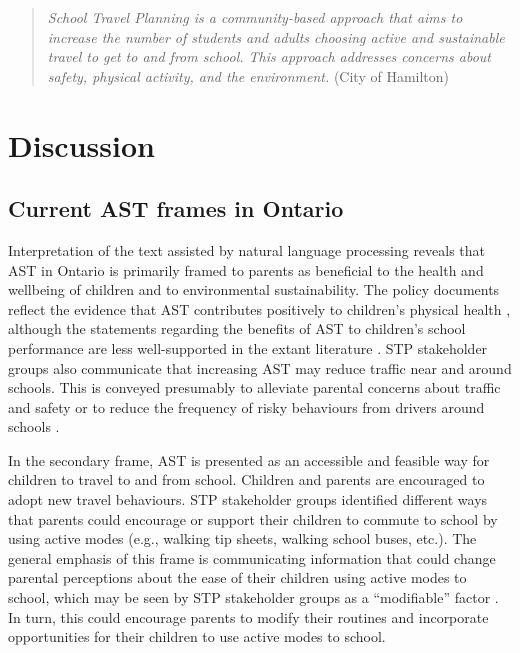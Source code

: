 \documentclass[preprint, 3p,
authoryear]{elsarticle} %
\begin{document}
\begin{quote}
\emph{School Travel Planning is a community-based approach that aims to
increase the number of students and adults choosing active and
sustainable travel to get to and from school. This approach addresses
concerns about safety, physical activity, and the environment.} (City of
Hamilton)
\end{quote}

\hypertarget{discussion}{%
\section{Discussion}\label{discussion}}

\hypertarget{current-ast-frames-in-ontario}{%
\subsection{Current AST frames in
Ontario}\label{current-ast-frames-in-ontario}}

Interpretation of the text assisted by natural language processing
reveals that AST in Ontario is primarily framed to parents as beneficial
to the health and wellbeing of children and to environmental
sustainability. The policy documents reflect the evidence that AST
contributes positively to children's physical health
\citep[see][]{faulknerActiveSchoolTransport2009, schoeppeAssociationsChildrenActive2015},
although the statements regarding the benefits of AST to children's
school performance are less well-supported in the extant literature
\citep{westmanTravelChildWellbeing2020}. STP stakeholder groups also
communicate that increasing AST may reduce traffic near and around
schools. This is conveyed presumably to alleviate parental concerns
about traffic and safety
\citep{eversParentSafetyPerceptions2014, mammenUnderstandingDriveEscort2012, rothmanAssociationsParentsPerception2015, wilsonUnderstandingChildParent2018}
or to reduce the frequency of risky behaviours from drivers around
schools \citep{rothmanSchoolEnvironmentStudent2017}.

In the secondary frame, AST is presented as an accessible and feasible
way for children to travel to and from school. Children and parents are
encouraged to adopt new travel behaviours. STP stakeholder groups
identified different ways that parents could encourage or support their
children to commute to school by using active modes (e.g., walking tip
sheets, walking school buses, etc.). The general emphasis of this frame
is communicating information that could change parental perceptions
about the ease of their children using active modes to school, which may
be seen by STP stakeholder groups as a ``modifiable'' factor
\citep[see][]{riaziCorrelatesChildrenIndependent2019}. In turn, this
could encourage parents to modify their routines and incorporate
opportunities for their children to use active modes to school.
\end{document}

